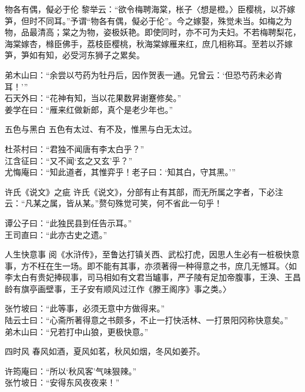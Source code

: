 \begin{yulu}{物各有偶，儗必于伦}
黎举云：“欲令梅聘海棠，枨子〈想是橙。〉臣樱桃，以芥嫁笋，但时不同耳。”予谓“物各有偶，儗必于伦”。今之嫁娶，殊觉未当。如梅之为物，品最清高；棠之为物，姿极妖艳。即使同时，亦不可为夫妇。不若梅聘梨花，海棠嫁杏，橼臣佛手，荔枝臣樱桃，秋海棠嫁雁来红，庶几相称耳。至若以芥嫁笋，笋如有知，必受河东狮子之累矣。
\begin{comments}
弟木山曰：“余尝以芍药为牡丹后，因作贺表一通。兄曾云：‘但恐芍药未必肯耳！’” \\
石天外曰：“花神有知，当以花果数昇谢蹇修矣。” \\
姜学在曰：“雁来红做新郎，真个是老少年也。”
\end{comments}
\end{yulu}

\begin{yulu}{五色与黑白}
五色有太过、有不及，惟黑与白无太过。
\begin{comments}
杜茶村曰：“君独不闻唐有李太白乎？” \\
江含征曰：“又不闻‘玄之又玄’乎？” \\
尤悔庵曰：“知此道者，其惟弈乎！老子曰：‘知其白，守其黑。’”
\end{comments}
\end{yulu}

\begin{yulu}{许氏《说文》之疵}
许氏《说文》，分部有止有其部，而无所属之字者，下必注云：“凡某之属，皆从某。”赘句殊觉可笑，何不省此一句乎！
\begin{comments}
谭公子曰：“此独民县到任告示耳。” \\
王司直曰：“此亦古史之遗。”
\end{comments}
\end{yulu}

\begin{yulu}{人生快意事}
阅《水浒传》，至鲁达打镇关西、武松打虎，因思人生必有一桩极快意事，方不枉在生一场。即不能有其事，亦须著得一种得意之书，庶几无憾耳。〈如李太白有贵妃捧砚事，司马相如有文君当罏事，严子陵有足加帝腹事，王涣、王昌龄有旗亭画壁事，王子安有顺风过江作《滕王阁序》事之类。〉
\begin{comments}
张竹坡曰：“此等事，必须无意中方做得来。” \\
陆云士曰：“心斋所著得意之书颇多，不止一打快活林、一打景阳冈称快意矣。” \\
弟木山曰：“兄若打中山狼，更极快意。”
\end{comments}
\end{yulu}

\begin{yulu}{四时风}
春风如酒，夏风如茗，秋风如烟，冬风如姜芥。
\begin{comments}
许筠庵曰：“所以‘秋风客’气味狠辣。” \\
张竹坡日：“安得东风夜夜来！”
\end{comments}
\end{yulu}

